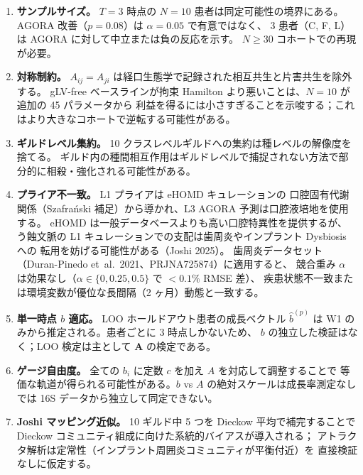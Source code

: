 \documentclass[11pt,a4paper]{article}
\newcommand{\bA}{\mathbf{A}}
\begin{document}
\begin{enumerate}
  \item \textbf{サンプルサイズ。} $T=3$ 時点の $N=10$ 患者は同定可能性の境界にある。
        AGORA 改善（$p=0.08$）は $\alpha=0.05$ で有意ではなく、
        3 患者（C, F, L）は AGORA に対して中立または負の反応を示す。
        $N\geq 30$ コホートでの再現が必要。

  \item \textbf{対称制約。} $A_{ij}=A_{ji}$ は経口生態学で記録された相互共生と片害共生を除外する。
        gLV-free ベースラインが拘束 Hamilton より悪いことは、$N=10$ が追加の 45 パラメータから
        利益を得るには小さすぎることを示唆する；これはより大きなコホートで逆転する可能性がある。

  \item \textbf{ギルドレベル集約。} 10 クラスレベルギルドへの集約は種レベルの解像度を捨てる。
        ギルド内の種間相互作用はギルドレベルで捕捉されない方法で部分的に相殺・強化される可能性がある。

  \item \textbf{プライア不一致。} L1 プライアは eHOMD キュレーションの
        口腔固有代謝関係（Szafra\'{n}ski 補足）から導かれ、L3 AGORA 予測は口腔液培地を使用する。
        eHOMD は一般データベースよりも高い口腔特異性を提供するが、
        う蝕文脈の L1 キュレーションでの支配は歯周炎やインプラント Dysbiosis への
        転用を妨げる可能性がある（Joshi 2025）。
        歯周炎データセット（Duran-Pinedo et~al.~2021、PRJNA725874）に適用すると、
        競合重み $\alpha$ は効果なし（$\alpha\in\{0,0.25,0.5\}$ で $< 0.1\%$ RMSE 差）、
        疾患状態不一致または環境変数が優位な長間隔（2 ヶ月）動態と一致する。

  \item \textbf{単一時点 $b$ 適応。} LOO ホールドアウト患者の成長ベクトル $\hat{b}^{(p)}$ は
        W1 のみから推定される。患者ごとに 3 時点しかないため、
        $b$ の独立した検証はなく；LOO 検定は主として $\bA$ の検定である。

  \item \textbf{ゲージ自由度。} 全ての $b_i$ に定数 $c$ を加え $A$ を対応して調整することで
        等価な軌道が得られる可能性がある。$b$ vs $A$ の絶対スケールは成長率測定なしでは
        16S データから独立して同定できない。

  \item \textbf{Joshi マッピング近似。} 10 ギルド中 5 つを Dieckow 平均で補完することで
        Dieckow コミュニティ組成に向けた系統的バイアスが導入される；
        アトラクタ解析は定常性（インプラント周囲炎コミュニティが平衡付近）を
        直接検証なしに仮定する。
\end{enumerate}
\end{document}
